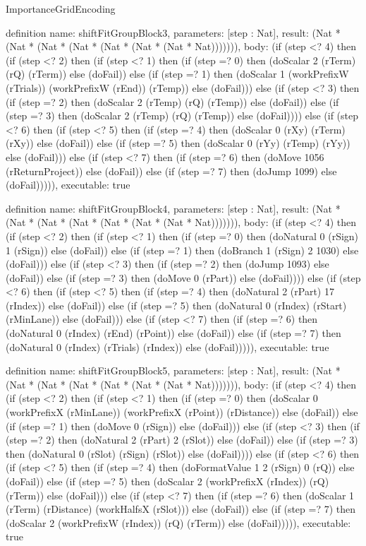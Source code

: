\begin{lexlean}{ImportanceGridEncoding}
\begin{semanticmodule}
definition{
  name: shiftFitGroupBlock3,
  parameters: [step : Nat],
  result: (Nat * (Nat * (Nat * (Nat * (Nat * (Nat * (Nat * Nat))))))),
  body: (if (step <? 4) then
      (if (step <? 2) then
      (if (step <? 1) then
      (if (step =? 0) then (doScalar 2 (rTerm) (rQ) (rTerm)) else (doFail)) else
      (if (step =? 1) then (doScalar 1 (workPrefixW (rTrials)) (workPrefixW (rEnd)) (rTemp)) else (doFail))) else
      (if (step <? 3) then
      (if (step =? 2) then (doScalar 2 (rTemp) (rQ) (rTemp)) else (doFail)) else
      (if (step =? 3) then (doScalar 2 (rTemp) (rQ) (rTemp)) else (doFail)))) else
      (if (step <? 6) then
      (if (step <? 5) then
      (if (step =? 4) then (doScalar 0 (rXy) (rTerm) (rXy)) else (doFail)) else
      (if (step =? 5) then (doScalar 0 (rYy) (rTemp) (rYy)) else (doFail))) else
      (if (step <? 7) then
      (if (step =? 6) then (doMove 1056 (rReturnProject)) else (doFail)) else
      (if (step =? 7) then (doJump 1099) else (doFail))))),
  executable: true
}

definition{
  name: shiftFitGroupBlock4,
  parameters: [step : Nat],
  result: (Nat * (Nat * (Nat * (Nat * (Nat * (Nat * (Nat * Nat))))))),
  body: (if (step <? 4) then
      (if (step <? 2) then
      (if (step <? 1) then
      (if (step =? 0) then (doNatural 0 (rSign) 1 (rSign)) else (doFail)) else
      (if (step =? 1) then (doBranch 1 (rSign) 2 1030) else (doFail))) else
      (if (step <? 3) then
      (if (step =? 2) then (doJump 1093) else (doFail)) else
      (if (step =? 3) then (doMove 0 (rPart)) else (doFail)))) else
      (if (step <? 6) then
      (if (step <? 5) then
      (if (step =? 4) then (doNatural 2 (rPart) 17 (rIndex)) else (doFail)) else
      (if (step =? 5) then (doNatural 0 (rIndex) (rStart) (rMinLane)) else (doFail))) else
      (if (step <? 7) then
      (if (step =? 6) then (doNatural 0 (rIndex) (rEnd) (rPoint)) else (doFail)) else
      (if (step =? 7) then (doNatural 0 (rIndex) (rTrials) (rIndex)) else (doFail))))),
  executable: true
}

definition{
  name: shiftFitGroupBlock5,
  parameters: [step : Nat],
  result: (Nat * (Nat * (Nat * (Nat * (Nat * (Nat * (Nat * Nat))))))),
  body: (if (step <? 4) then
      (if (step <? 2) then
      (if (step <? 1) then
      (if (step =? 0) then (doScalar 0 (workPrefixX (rMinLane)) (workPrefixX (rPoint)) (rDistance)) else (doFail)) else
      (if (step =? 1) then (doMove 0 (rSign)) else (doFail))) else
      (if (step <? 3) then
      (if (step =? 2) then (doNatural 2 (rPart) 2 (rSlot)) else (doFail)) else
      (if (step =? 3) then (doNatural 0 (rSlot) (rSign) (rSlot)) else (doFail)))) else
      (if (step <? 6) then
      (if (step <? 5) then
      (if (step =? 4) then (doFormatValue 1 2 (rSign) 0 (rQ)) else (doFail)) else
      (if (step =? 5) then (doScalar 2 (workPrefixX (rIndex)) (rQ) (rTerm)) else (doFail))) else
      (if (step <? 7) then
      (if (step =? 6) then (doScalar 1 (rTerm) (rDistance) (workHalfsX (rSlot))) else (doFail)) else
      (if (step =? 7) then (doScalar 2 (workPrefixW (rIndex)) (rQ) (rTerm)) else (doFail))))),
  executable: true
}


\end{semanticmodule}
\end{lexlean}
